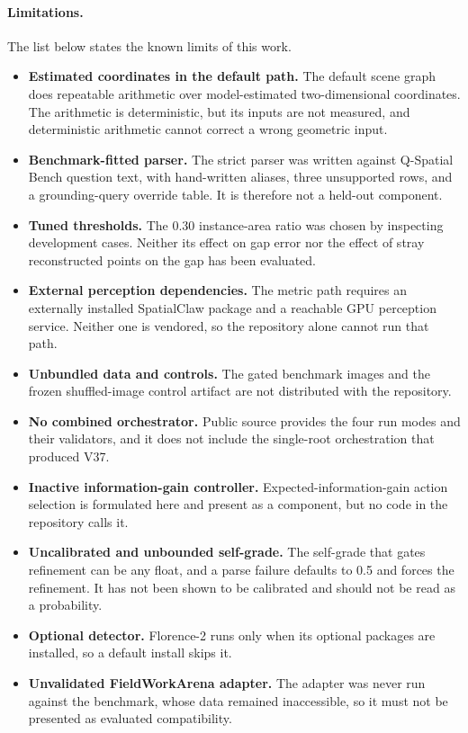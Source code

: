 \documentclass{article}
\begin{document}
\paragraph{Limitations.}
The list below states the known limits of this work.
\begin{itemize}[leftmargin=*,nosep,beginpenalty=10000]
  \item \textbf{Estimated coordinates in the default path.} The default scene graph does repeatable arithmetic over model-estimated two-dimensional coordinates. The arithmetic is deterministic, but its inputs are not measured, and deterministic arithmetic cannot correct a wrong geometric input.
  \item \textbf{Benchmark-fitted parser.} The strict parser was written against Q-Spatial Bench question text, with hand-written aliases, three unsupported rows, and a grounding-query override table. It is therefore not a held-out component.
  \item \textbf{Tuned thresholds.} The 0.30 instance-area ratio was chosen by inspecting development cases. Neither its effect on gap error nor the effect of stray reconstructed points on the gap has been evaluated.
  \item \textbf{External perception dependencies.} The metric path requires an externally installed SpatialClaw package and a reachable GPU perception service. Neither one is vendored, so the repository alone cannot run that path.
  \item \textbf{Unbundled data and controls.} The gated benchmark images and the frozen shuffled-image control artifact are not distributed with the repository.
  \item \textbf{No combined orchestrator.} Public source provides the four run modes and their validators, and it does not include the single-root orchestration that produced V37.
  \item \textbf{Inactive information-gain controller.} Expected-information-gain action selection is formulated here and present as a component, but no code in the repository calls it.
  \item \textbf{Uncalibrated and unbounded self-grade.} The self-grade that gates refinement can be any float, and a parse failure defaults to 0.5 and forces the refinement. It has not been shown to be calibrated and should not be read as a probability.
  \item \textbf{Optional detector.} Florence-2 runs only when its optional packages are installed, so a default install skips it.
  \item \textbf{Unvalidated FieldWorkArena adapter.} The adapter was never run against the benchmark, whose data remained inaccessible, so it must not be presented as evaluated compatibility.

\end{itemize}
\end{document}
